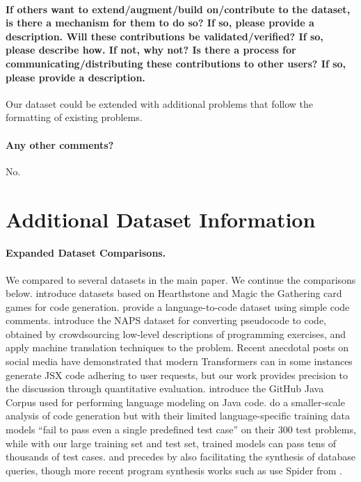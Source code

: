 \paragraph{If others want to extend/augment/build on/contribute to the
dataset, is there a mechanism for them to do so? If so, please
provide a description. Will these contributions be validated/verified?
If so, please describe how. If not, why not? Is there a process for communicating/distributing these contributions to other users? If so, please
provide a description.}
Our dataset could be extended with additional problems that follow the formatting of existing problems.

\paragraph{Any other comments?}
No.


\section{Additional Dataset Information}


\paragraph{Expanded Dataset Comparisons.}
We compared to several datasets in the \citep{NEURIPS2019_7298332f,yu2018spider,Raychev2016ProbabilisticMF,iyer-etal-2018-mapping,Lu2021CodeXGLUEAM} main paper. We continue the comparisons below.
\citet{Ling2016LatentPN} introduce datasets based on Hearthstone and Magic the Gathering card games for code generation. \citet{oda2015ase:pseudogen1} provide a language-to-code dataset using simple code comments. \citet{Zavershynskyi2018NAPSNP} introduce the NAPS dataset for converting pseudocode to code, obtained by crowdsourcing low-level descriptions of programming exercises, and apply machine translation techniques to the problem. Recent anecdotal posts on social media have demonstrated that modern Transformers can in some instances generate JSX code adhering to user requests, but our work provides precision to the discussion through quantitative evaluation. \citet{allamanis2013mining} introduce the GitHub Java Corpus used for performing language modeling on Java code. \citet{raca} do a smaller-scale analysis of code generation but with their limited language-specific training data models ``fail to pass even a single predefined test case'' on their 300 test problems, while with our large training set and test set, trained models can pass tens of thousands of test cases. \citet{Zelle1996LearningTP} and \citet{Tang2001UsingMC} precedes \citet{yu2018spider} by also facilitating the synthesis of database queries, though more recent program synthesis works such as \citet{wang2019rat} use Spider from \citet{yu2018spider}.

